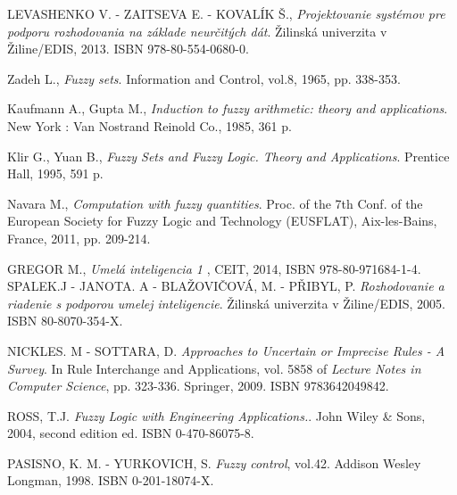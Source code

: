 \begin{thebibliography}{}                               
	 \label{literatura}


 LEVASHENKO V. - ZAITSEVA E. - KOVALÍK Š., {\it Projektovanie systémov pre podporu rozhodovania na základe neurčitých dát}. Žilinská univerzita v Žiline/EDIS, 2013. ISBN 978-80-554-0680-0.


 Zadeh L., {\it Fuzzy sets}. Information and Control, vol.8, 1965, pp. 338-353. 

 Kaufmann A., Gupta M., {\it Induction to fuzzy arithmetic: theory and applications}. New York : Van Nostrand Reinold Co., 1985, 361 p. 

 Klir G., Yuan B., {\it Fuzzy Sets and Fuzzy Logic. Theory and Applications}. Prentice Hall, 1995, 591 p. 

 Navara M., {\it Computation with fuzzy quantities}. Proc. of the 7th Conf. of the European Society for Fuzzy Logic and Technology (EUSFLAT), Aix-les-Bains, France, 2011, pp. 209-214.

 GREGOR M., {\it Umelá inteligencia 1} , CEIT, 2014, ISBN 978-80-971684-1-4.
 SPALEK.J - JANOTA. A - BLAŽOVIČOVÁ, M. - PŘIBYL, P. {\it Rozhodovanie a riadenie s podporou umelej inteligencie}. Žilinská univerzita v Žiline/EDIS, 2005. ISBN 80-8070-354-X. 

 NICKLES. M - SOTTARA, D. {\it Approaches to Uncertain or Imprecise Rules - A Survey}. In Rule Interchange and Applications, vol. 5858 of {\it Lecture Notes in Computer Science}, pp. 323-336. Springer, 2009. ISBN 9783642049842. 

 ROSS, T.J. {\it  Fuzzy Logic with Engineering Applications.}. John Wiley \& Sons, 2004, second edition ed. ISBN 0-470-86075-8. 


PASISNO, K. M. - YURKOVICH, S. {\it Fuzzy control}, vol.42. Addison Wesley Longman, 1998. ISBN 0-201-18074-X.  


\end{thebibliography}
